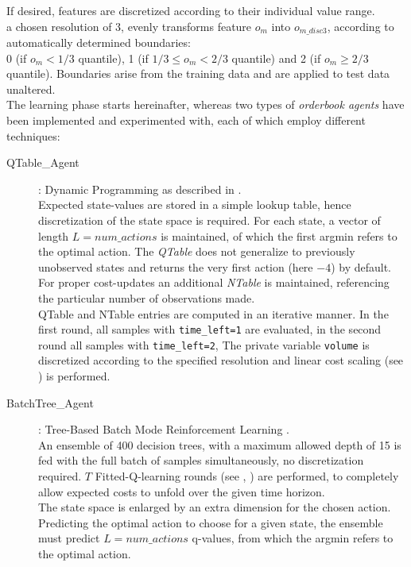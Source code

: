 If desired, features are discretized according to their individual value range.\\
\Eg a chosen resolution of 3, evenly transforms feature $o_m$ into $o_{m\_disc3}$, according to automatically determined boundaries: \\
0 (if $o_m< 1/3$ quantile), 1 (if $1/3 \leq o_m < 2/3$ quantile) and 2 (if $o_m \geq 2/3$ quantile). Boundaries arise from the training data and are applied to test data unaltered.\\

The learning phase starts hereinafter, whereas two types of \emph{orderbook agents} have been implemented and experimented with, each of which employ different techniques:

\begin{description}
\item[QTable\_Agent] : Dynamic Programming as described in .\\
Expected state-values are stored in a simple lookup table, hence discretization of the state space is required. For each state, a vector of length $L=num\_actions$ is maintained, of which the first argmin refers to the optimal action. The \emph{QTable} does not generalize to previously unobserved states and returns the very first action (here $-4$) by default. For proper cost-updates an additional \emph{NTable} is maintained, referencing the particular number of observations made.\\
QTable and NTable entries are computed in an iterative manner. In the first round, all samples with \lstinline!time_left=1! are evaluated, in the second round all samples with \lstinline!time_left=2!, \etc The private variable \lstinline!volume! is discretized according to the specified resolution and linear cost scaling (see ) is performed.

\item[BatchTree\_Agent]: Tree-Based Batch Mode Reinforcement Learning \Cite{Ernst:2005:TreeBasedBatchModeRL}.\\
An ensemble of 400 decision trees, with a maximum allowed depth of 15 is fed with the full batch of samples simultaneously, no discretization required. $T$ Fitted-Q-learning rounds (see , ) are performed, to completely allow expected costs to unfold over the given time horizon.\\
The state space is enlarged by an extra dimension for the chosen action. Predicting the optimal action to choose for a given state, the ensemble must predict $L=num\_actions$ q-values, from which the argmin refers to the optimal action.
\end{description}\bigskip

